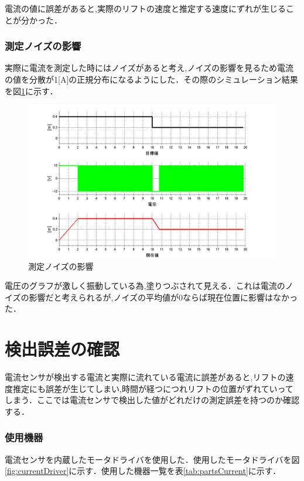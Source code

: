 電流の値に誤差があると,実際のリフトの速度と推定する速度にずれが生じることが分かった．

\subsubsection{測定ノイズの影響}
実際に電流を測定した時にはノイズがあると考え,ノイズの影響を見るため電流の値を分散が1[A]の正規分布になるようにした．その際のシミュレーション結果を図\ref{fig:sim2}に示す．

\begin{figure}[htbp]
 \begin{center}
    \includegraphics[width=150mm]{img/sim2.bmp}
    \end{center}
  \caption{測定ノイズの影響}
 \label{fig:sim2}
\end{figure}

電圧のグラフが激しく振動している為,塗りつぶされて見える．これは電流のノイズの影響だと考えられるが,ノイズの平均値が0ならば現在位置に影響はなかった．

\section{検出誤差の確認}
電流センサが検出する電流と実際に流れている電流に誤差があると,リフトの速度推定にも誤差が生じてしまい,時間が経つにつれリフトの位置がずれていってしまう．ここでは電流センサで検出した値がどれだけの測定誤差を持つのか確認する．

\subsubsection{使用機器}
電流センサを内蔵したモータドライバを使用した．使用したモータドライバを図\ref{fig:currentDriver}に示す．使用した機器一覧を表\ref{tab:partsCurrent}に示す．

